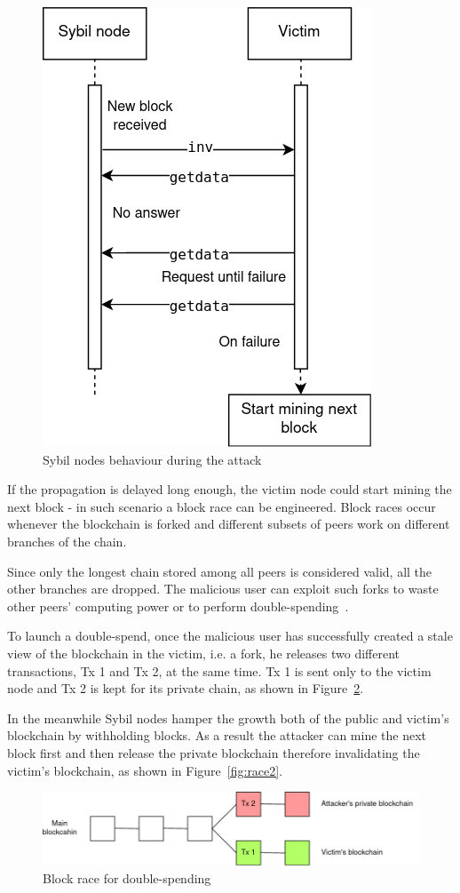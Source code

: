 \begin{figure}[h!]
	\includegraphics[width=.4\textwidth]{pict/sybil.png}
	\centering
	\caption{Sybil nodes behaviour during the attack}
	\label{fig:sybil}
\end{figure}

If the propagation is delayed long enough, the victim node could start mining the next block - in such scenario a block race can be engineered. Block races occur whenever the blockchain is forked and different subsets of peers work on different branches of the chain.

Since only the longest chain stored among all peers is considered valid, all the other branches are dropped. The malicious user can exploit such forks to waste other peers' computing power or to perform double-spending~\cite{zhang-ds-sybil}. 

To launch a double-spend, once the malicious user has successfully created a stale view of the blockchain in the victim, i.e. a fork, he releases two different transactions, Tx 1 and Tx 2, at the same time. Tx 1 is sent only to the victim node and Tx 2 is kept for its private chain, as shown in Figure~\ref{fig:race1}.

In the meanwhile Sybil nodes hamper the growth both of the public and victim's blockchain by withholding blocks. As a result the attacker can mine the next block first and then release the private blockchain therefore invalidating the victim's blockchain, as shown in Figure~\ref{fig:race2}.

\begin{figure}[h!]
	\includegraphics[width=.9\textwidth]{pict/blockrace1.png}
	\centering
	\caption{Block race for double-spending}
	\label{fig:race1}
\end{figure}

